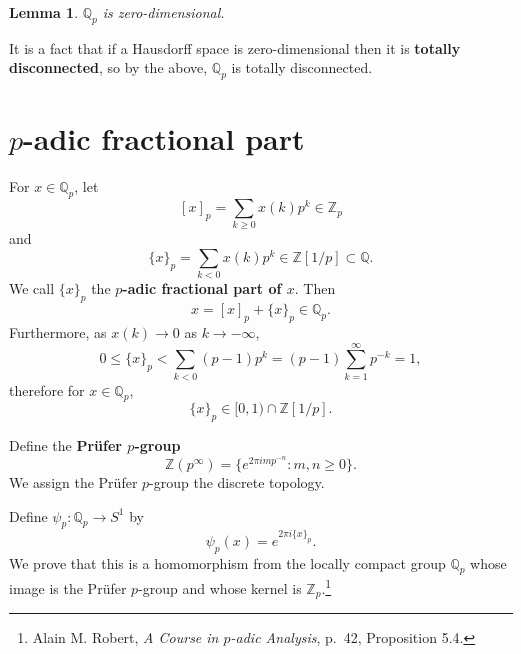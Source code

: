 \documentclass{article}
\newtheorem{lemma}[theorem]{Lemma}
\theoremstyle{definition}
\begin{document}
\begin{lemma}
$\mathbb{Q}_p$ is zero-dimensional.
\end{lemma}

It is a fact that if a Hausdorff space is zero-dimensional then it is \textbf{totally disconnected}, so
by the above, $\mathbb{Q}_p$ is totally disconnected.



\section{$p$-adic fractional part}
For $x \in \mathbb{Q}_p$, let 
\[
[x]_p = \sum_{k \geq 0} x(k) p^k \in \mathbb{Z}_p
\]
and
\[
\{x\}_p = \sum_{k<0} x(k) p^k \in \mathbb{Z}[1/p] \subset \mathbb{Q}.
\]
We call $\{x\}_p$ the \textbf{$p$-adic fractional part of $x$}.
Then 
\[
x = [x]_p + \{x\}_p \in \mathbb{Q}_p.
\]
Furthermore, as $x(k) \to 0$ as $k \to -\infty$,
\[
0 \leq \{x\}_p < \sum_{k<0} (p-1)p^k = (p-1) \sum_{k=1}^\infty p^{-k} = 1,
\] 
therefore for $x \in \mathbb{Q}_p$,
\[
\{x\}_p \in [0,1) \cap \mathbb{Z}[1/p].
\]

Define the \textbf{Pr\"ufer $p$-group}
\[
\mathbb{Z}(p^\infty) = \{e^{2\pi im p^{-n}} : m,n \geq 0\}.
\]
We assign the Pr\"ufer $p$-group the discrete topology.



Define $\psi_p:\mathbb{Q}_p \to S^1$ by
\[
\psi_p(x) = e^{2\pi i\{x\}_p}.
\]
We prove that this is a homomorphism from the locally compact group $\mathbb{Q}_p$ whose
image is the Pr\"ufer $p$-group and whose kernel is $\mathbb{Z}_p$.\footnote{Alain M. Robert, {\em A Course in $p$-adic Analysis}, p.~42, Proposition 5.4.}
\end{document}
